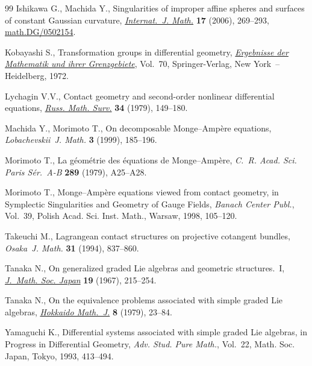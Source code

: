 \documentclass[11pt]{article}
\begin{document}
\begin{thebibliography}{99}
Ishikawa G., Machida Y., Singularities of improper af\/f\/ine spheres and surfaces
  of constant {G}aussian curvature, \href{http://dx.doi.org/10.1142/S0129167X06003485}{\textit{Internat.~J. Math.}} \textbf{17}
  (2006), 269--293, \href{http://arxiv.org/abs/math.DG/0502154}{math.DG/0502154}.

Kobayashi S., Transformation groups in dif\/ferential geometry, \href{http://dx.doi.org/10.1007/978-3-642-61981-6}{\textit{Ergebnisse der Mathematik und
  ihrer Grenz\-gebiete}}, Vol.~70,
  Springer-Verlag, New York~-- Heidelberg, 1972.

Lychagin V.V., Contact geometry and second-order nonlinear dif\/ferential
  equations, \href{http://dx.doi.org/10.1070/RM1979v034n01ABEH002873}{\textit{Russ. Math. Surv.}} \textbf{34} (1979), 149--180.

Machida Y., Morimoto T., On decomposable {M}onge--{A}mp\`ere equations,
  \textit{Lobachevskii~J. Math.} \textbf{3} (1999), 185--196.

Morimoto T., La g\'eom\'etrie des \'equations de {M}onge--{A}mp\`ere,
  \textit{C.~R. Acad. Sci. Paris S\'er.~A-B} \textbf{289} (1979), A25--A28.

Morimoto T., Monge--Amp{\`e}re equations viewed from contact geometry, in
  Symplectic Singularities and Geometry of Gauge Fields, \textit{Banach Center
  Publ.}, Vol.~39, Polish Acad. Sci. Inst. Math., Warsaw, 1998, 105--120.

Takeuchi M., Lagrangean contact structures on projective cotangent bundles,
  \textit{Osaka~J. Math.} \textbf{31} (1994), 837--860.

Tanaka N., On generalized graded {L}ie algebras and geometric structures.~{I},
  \href{http://dx.doi.org/10.2969/jmsj/01920215}{\textit{J.~Math. Soc. Japan}} \textbf{19} (1967), 215--254.

Tanaka N., On the equivalence problems associated with simple graded {L}ie
  algebras, \href{http://dx.doi.org/10.14492/hokmj/1381758416}{\textit{Hokkaido Math.~J.}} \textbf{8} (1979), 23--84.

Yamaguchi K., Dif\/ferential systems associated with simple graded {L}ie
  algebras, in Progress in Dif\/ferential Geometry, \textit{Adv. Stud. Pure
  Math.}, Vol.~22, Math. Soc. Japan, Tokyo, 1993, 413--494.

\end{thebibliography}
\end{document}
